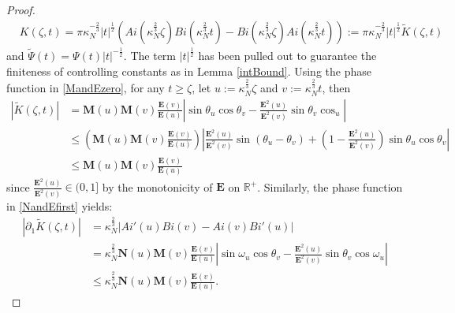 \documentclass[11pt]{article}
\numberwithin{equation}{section}%
\numberwithin{theorem}{section}
\begin{document}
\begin{proof}
\begin{equation*}
\begin{split}
           &K(\zeta,t)=\pi\kappa_N^{-\frac{2}{3}}|t|^\frac{1}{2} \left(Ai\left(\kappa_N^\frac{2}{3}\zeta\right)Bi\left(\kappa_N^\frac{2}{3} t\right)-Bi\left(\kappa_N^\frac{2}{3}\zeta\right)Ai\left(\kappa_N^\frac{2}{3} t\right)\right):=\pi\kappa_N^{-\frac{2}{3}}|t|^\frac{1}{2}\tilde{K}(\zeta,t)
    \end{split}
    \end{equation*}
    and $\tilde{\Psi}(t)=\Psi(t)|t|^{-\frac{1}{2}}$. The term $|t|^\frac{1}{2}$ has been pulled out to guarantee the finiteness of controlling constants as in Lemma \ref{intBound}. Using the phase function in \eqref{MandEzero}, for any $t\ge\zeta$, let $u:=\kappa_N^\frac{2}{3}\zeta$ and $v:=\kappa_N^\frac{2}{3}t$, then
    \begin{equation}\label{B4K1}
        \begin{split}
            |\tilde{K}(\zeta,t)|&=\mathbf{M}\left(u\right)\mathbf{M}\left(v\right)\frac{\mathbf{E}\left(v\right)}{\mathbf{E}\left(u\right)}\left|\sin\theta_u\cos\theta_v-\frac{\mathbf{E}^2\left(u\right)}{\mathbf{E}^2\left(v\right)}\sin\theta_v\cos_u\right|\\
&\le\left(\mathbf{M}\left(u\right)\mathbf{M}\left(v\right)\frac{\mathbf{E}\left(v\right)}{\mathbf{E}\left(u\right)}\right)\left|\frac{\mathbf{E}^2(u)}{\mathbf{E}^2(v)}\sin\left(\theta_u-\theta_v\right)+\left(1-\frac{\mathbf{E}^2(u)}{\mathbf{E}^2(v)}\right)\sin\theta_u\cos\theta_v\right|\\
&\le\mathbf{M}\left(u\right)\mathbf{M}\left(v\right)\frac{\mathbf{E}\left(v\right)}{\mathbf{E}\left(u\right)}
        \end{split}
    \end{equation}
    since $\frac{\mathbf{E}^2(u)}{\mathbf{E}^2(v)}\in(0,1]$ by the monotonicity of $\mathbf{E}$ on $\mathbb{R}^+$. Similarly, the phase function in \eqref{NandEfirst} yields:
    \begin{equation}\label{B4K2}
        \begin{split}
            |\partial_1\tilde{K}(\zeta,t)|&=\kappa_N^\frac{2}{3}\left|Ai'(u)Bi(v)-Ai(v)Bi'(u)\right|\\
            &=\kappa_N^\frac{2}{3}\mathbf{N}(u)\mathbf{M}(v)\frac{\mathbf{E}(v)}{\mathbf{E}(u)}\left|\sin\omega_u\cos\theta_v-\frac{\mathbf{E}^2(u)}{\mathbf{E}^2(v)}\sin\theta_v\cos\omega_u\right|\\&\le\kappa_N^\frac{2}{3}\mathbf{N}(u)\mathbf{M}(v)\frac{\mathbf{E}(v)}{\mathbf{E}(u)}.
        \end{split}
    \end{equation}

\end{proof}
\end{document}
